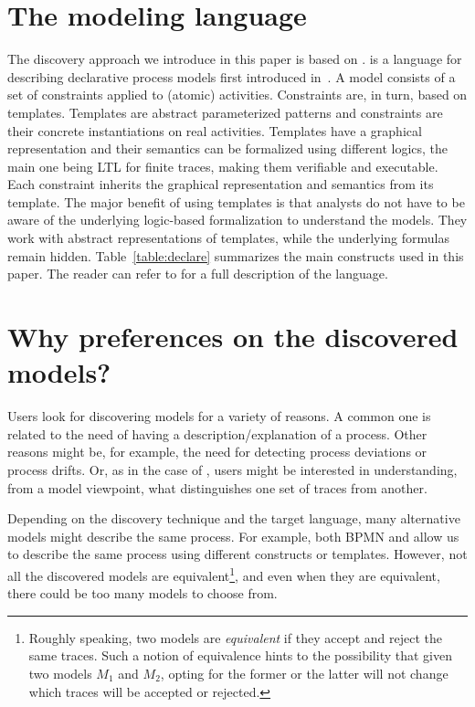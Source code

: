 
\section{The modeling language}
\label{sec:prel}
The discovery approach we introduce in this paper is based on \declare. \declare is a language for describing declarative process models first introduced
in~\cite{DBLP:conf/edoc/PesicSA07}. A \declare model consists of a set of constraints applied to
(atomic) activities. Constraints are, in turn, based on templates. Templates are
abstract parameterized patterns and constraints are their concrete
instantiations on real activities.
Templates have a graphical representation and their semantics can be formalized using different logics, the main one being  LTL for finite traces, making them verifiable and executable.
Each constraint inherits the graphical representation and semantics from its
template.
The major benefit of using templates is that analysts do not have to be aware of
the underlying logic-based formalization to understand the models. They work
with abstract representations of templates, while the underlying formulas
remain hidden. Table~\ref{table:declare} summarizes the main \declare constructs used in this paper. The reader can refer to \cite{DBLP:conf/edoc/PesicSA07} for a full description
of the language.





\section{Why preferences on the discovered models?}
\label{sec:example}


Users look for discovering models for a variety of reasons. A common one is related to the need of having a description/explanation of a process. Other reasons might be, for example, the need for detecting process deviations or process drifts. Or, as in the case of \nd, users might be interested in understanding, from a model viewpoint, what distinguishes one set of traces from another. 

Depending on the discovery technique and the target language, many alternative models might describe the same process. For example, both BPMN and \declare allow us to describe the same process using different constructs or templates. However, not all the discovered models are equivalent\footnote{Roughly speaking, two models are \emph{equivalent} if they accept and reject the same traces. Such a notion of equivalence hints to the possibility that given two models $M_1$ and $M_2$, %
opting for the former or the latter will not change which traces will be accepted or rejected.}, and even when they are equivalent, there could be too many models to choose from.

